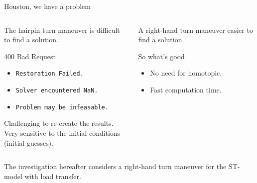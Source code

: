 \begin{frame}{Houston, we have a problem}
    \begin{columns}
        \begin{column}{0.5\textwidth}
            The hairpin turn maneuver is difficult to find a solution.

            \begin{alertblock}{400 Bad Request}
                \begin{itemize}
                    \item[\faSkullCrossbones] \texttt{Restoration Failed.}
                    \item[\faSkullCrossbones] \texttt{Solver encountered NaN.}
                    \item[\faSkullCrossbones] \texttt{Problem may be infeasable.}
                \end{itemize}
            \end{alertblock}

            Challenging to re-create the results. \\
            Very sensitive to the initial conditions (initial guesses). 
        \end{column}
        \begin{column}{0.5\textwidth} \pause
            A right-hand turn maneuver easier to find a solution.

            \begin{block}{So what's good}
                \begin{itemize}
                    \item No need for homotopic.
                    \item Fast computation time.
                \end{itemize}
            \end{block}
        \end{column}
    \end{columns}

    \pause
    \begin{exampleblock}{}
        The investigation hereafter considers a right-hand turn maneuver for the ST-model with load transfer.
    \end{exampleblock}

\end{frame}